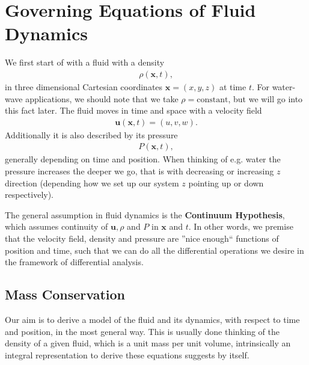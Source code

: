 

\usepackage{amsmath}



\maketitle
\tableofcontents

\section{Governing Equations of Fluid Dynamics}
We first start of with a fluid with a density
\begin{align}
    \rho(\mathbf{x}, t),
\end{align}
in three dimensional Cartesian coordinates $\mathbf{x} = (x, y, z)$ at time
$t$. For water-wave applications, we should note that we take
$\rho=\text{constant}$, but we will go into this fact later. The fluid moves
in time and space with a velocity field
\begin{align}
    \mathbf{u}(\mathbf{x}, t) = (u, v, w).
\end{align}
Additionally it is also described by its pressure
\begin{align}
    P(\mathbf{x}, t),
\end{align}
generally depending on time and position. When thinking of e.g. water the
pressure increases the deeper we go, that is with decreasing or increasing $z$
direction (depending how we set up our system $z$ pointing up or down
respectively).

The general assumption in fluid dynamics is the \textbf{Continuum
Hypothesis}, which assumes continuity of $\textbf{u}, \rho$ and $P$ in
$\mathbf{x}$ and $t$. In other words, we premise that the velocity field,
density and pressure are ''nice enough`` functions of position and time, such
that we can do all the differential operations we desire in the framework of
differential analysis.
\subsection{Mass Conservation}
Our aim is to derive a model of the fluid and its dynamics, with respect to
time and position, in the most general way. This is usually done thinking
of the density of a given fluid, which is a unit mass per unit volume,
intrinsically  an integral representation to derive these equations suggests
by itself.

